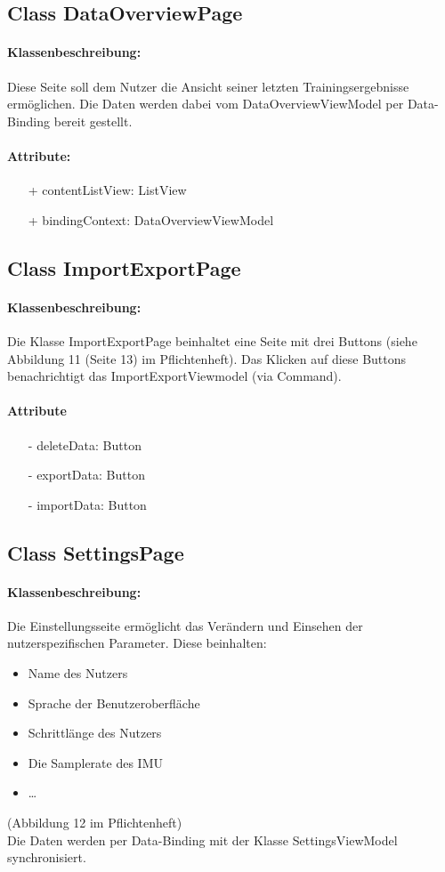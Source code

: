 \documentclass[a4paper,12pt]{article}
\begin{document}
	\subsection{Class DataOverviewPage}
		\paragraph{Klassenbeschreibung:}
		Diese Seite soll dem Nutzer die Ansicht seiner letzten Trainingsergebnisse ermöglichen.
		Die Daten werden dabei vom DataOverviewViewModel per Data-Binding bereit gestellt.
		\paragraph{Attribute:}
		\begin{itemize}
			\item[+] contentListView: ListView
			\item[+] bindingContext: DataOverviewViewModel 
		\end{itemize}

	\subsection{Class ImportExportPage}
		\paragraph{Klassenbeschreibung:}
		Die Klasse ImportExportPage beinhaltet eine Seite mit drei Buttons (siehe Abbildung 11 (Seite 13) im Pflichtenheft).
		Das Klicken auf diese Buttons benachrichtigt das ImportExportViewmodel (via Command).
		\paragraph{Attribute}
		\begin{itemize}
			\item [-]deleteData: Button
			\item [-]exportData: Button
			\item [-]importData: Button
		\end{itemize}

	\subsection{Class SettingsPage}
		\paragraph{Klassenbeschreibung:}
		Die Einstellungsseite ermöglicht das Verändern und Einsehen der nutzerspezifischen Parameter.
		Diese beinhalten:
		\begin{itemize}
			\item Name des Nutzers
			\item Sprache der Benutzeroberfläche
			\item Schrittlänge des Nutzers
			\item Die Samplerate des \Gls{IMU}
			\item \dots
		\end{itemize}
		(Abbildung 12 im Pflichtenheft)\\
		Die Daten werden per Data-Binding mit der Klasse SettingsViewModel synchronisiert.
\end{document}
